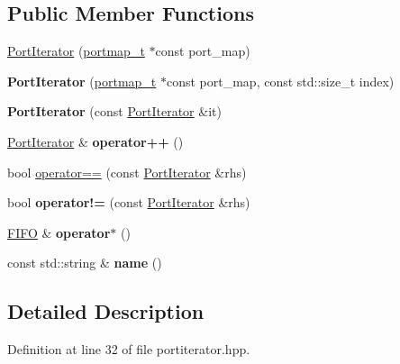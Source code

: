 \subsection*{Public Member Functions}
\begin{DoxyCompactItemize}
\item 
\hyperlink{class_port_iterator_a3d68fbe1ad98fbb8c7e25a9aecf8b5bf}{Port\+Iterator} (\hyperlink{structportmap__t}{portmap\+\_\+t} $\ast$const port\+\_\+map)
\item 
\hypertarget{class_port_iterator_acbaabd514cbbdcb0bb11e6ba381e9d3e}{}\label{class_port_iterator_acbaabd514cbbdcb0bb11e6ba381e9d3e} 
{\bfseries Port\+Iterator} (\hyperlink{structportmap__t}{portmap\+\_\+t} $\ast$const port\+\_\+map, const std\+::size\+\_\+t index)
\item 
\hypertarget{class_port_iterator_a68e10983b59c3889b73bff2635f2bb88}{}\label{class_port_iterator_a68e10983b59c3889b73bff2635f2bb88} 
{\bfseries Port\+Iterator} (const \hyperlink{class_port_iterator}{Port\+Iterator} \&it)
\item 
\hypertarget{class_port_iterator_a4695f037ef33e9ba809199401c9cb10f}{}\label{class_port_iterator_a4695f037ef33e9ba809199401c9cb10f} 
\hyperlink{class_port_iterator}{Port\+Iterator} \& {\bfseries operator++} ()
\item 
bool \hyperlink{class_port_iterator_ad41e4cf00699a49d6e0a30c8af3e7469}{operator==} (const \hyperlink{class_port_iterator}{Port\+Iterator} \&rhs)
\item 
\hypertarget{class_port_iterator_a4e2b7f7908ab1537205337d8d99a8e70}{}\label{class_port_iterator_a4e2b7f7908ab1537205337d8d99a8e70} 
bool {\bfseries operator!=} (const \hyperlink{class_port_iterator}{Port\+Iterator} \&rhs)
\item 
\hypertarget{class_port_iterator_a2d045feb7d7679a6968446fd78daed9d}{}\label{class_port_iterator_a2d045feb7d7679a6968446fd78daed9d} 
\hyperlink{class_f_i_f_o}{F\+I\+FO} \& {\bfseries operator$\ast$} ()
\item 
\hypertarget{class_port_iterator_a6ea735767e4a0ba21207fa6cbce9809d}{}\label{class_port_iterator_a6ea735767e4a0ba21207fa6cbce9809d} 
const std\+::string \& {\bfseries name} ()
\end{DoxyCompactItemize}


\subsection{Detailed Description}


Definition at line 32 of file portiterator.\+hpp.



